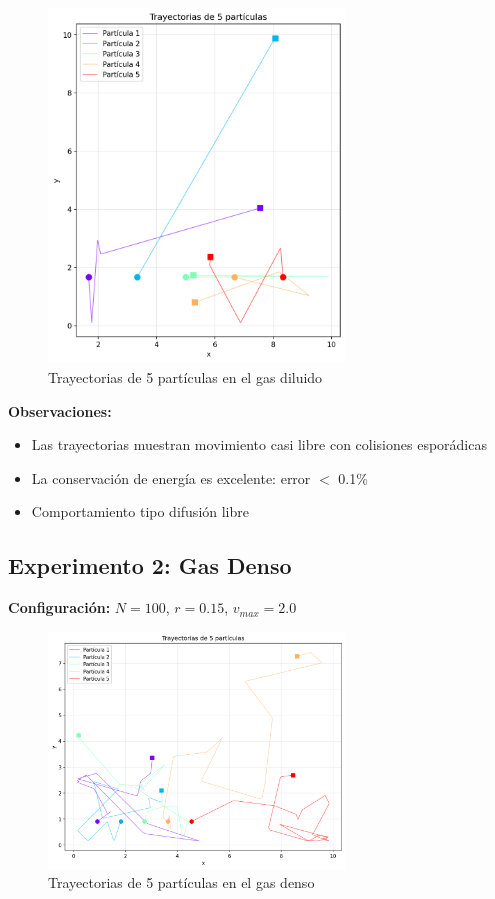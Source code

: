\documentclass[12pt,a4paper]{article}
\begin{document}
\begin{figure}[H]
\centering
\includegraphics[width=0.7\textwidth]{../results/trayectorias_gas_diluido.png}
\caption{Trayectorias de 5 partículas en el gas diluido}
\end{figure}

\textbf{Observaciones:}
\begin{itemize}
    \item Las trayectorias muestran movimiento casi libre con colisiones esporádicas
    \item La conservación de energía es excelente: error $<$ 0.1\%
    \item Comportamiento tipo difusión libre
\end{itemize}

\subsection{Experimento 2: Gas Denso}

\textbf{Configuración:} $N=100$, $r=0.15$, $v_{max}=2.0$

\begin{figure}[H]
\centering
\includegraphics[width=0.7\textwidth]{../results/trayectorias_gas_denso.png}
\caption{Trayectorias de 5 partículas en el gas denso}
\end{figure}
\end{document}
